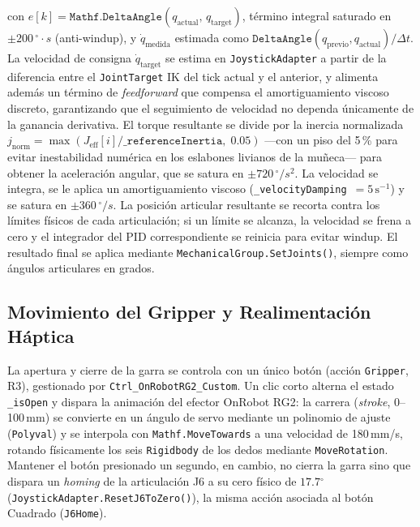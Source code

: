 con $e[k] = \texttt{Mathf.DeltaAngle}(q_{\text{actual}},\, q_{\text{target}})$, término integral saturado en $\pm 200\,{^\circ}{\cdot}s$ (anti-windup), y $\dot{q}_{\text{medida}}$ estimada como $\texttt{DeltaAngle}(q_{\text{previo}}, q_{\text{actual}})/\Delta t$. La velocidad de consigna $\dot{q}_{\text{target}}$ se estima en \texttt{JoystickAdapter} a partir de la diferencia entre el \texttt{JointTarget} IK del tick actual y el anterior, y alimenta además un término de \textit{feedforward} que compensa el amortiguamiento viscoso discreto, garantizando que el seguimiento de velocidad no dependa únicamente de la ganancia derivativa. El torque resultante se divide por la inercia normalizada $j_{\text{norm}} = \max(J_{\text{eff}}[i] / \texttt{\_referenceInertia},\; 0.05)$ ---con un piso del 5\,\% para evitar inestabilidad numérica en los eslabones livianos de la muñeca--- para obtener la aceleración angular, que se satura en $\pm 720\,{^\circ}/s^2$. La velocidad se integra, se le aplica un amortiguamiento viscoso (\texttt{\_velocityDamping}~$= 5\,\mathrm{s^{-1}}$) y se satura en $\pm 360\,{^\circ}/s$. La posición articular resultante se recorta contra los límites físicos de cada articulación; si un límite se alcanza, la velocidad se frena a cero y el integrador del PID correspondiente se reinicia para evitar windup. El resultado final se aplica mediante \texttt{MechanicalGroup.SetJoints()}, siempre como ángulos articulares en grados.

\subsection{Movimiento del Gripper y Realimentación Háptica}

La apertura y cierre de la garra se controla con un único botón (acción \texttt{Gripper}, R3), gestionado por \texttt{Ctrl\_OnRobotRG2\_Custom}. Un clic corto alterna el estado \texttt{\_isOpen} y dispara la animación del efector OnRobot RG2: la carrera (\textit{stroke}, 0--100\,mm) se convierte en un ángulo de servo mediante un polinomio de ajuste (\texttt{Polyval}) y se interpola con \texttt{Mathf.MoveTowards} a una velocidad de 180\,mm/s, rotando físicamente los seis \texttt{Rigidbody} de los dedos mediante \texttt{MoveRotation}. Mantener el botón presionado un segundo, en cambio, no cierra la garra sino que dispara un \textit{homing} de la articulación J6 a su cero físico de $17.7{^\circ}$ (\texttt{JoystickAdapter.ResetJ6ToZero()}), la misma acción asociada al botón Cuadrado (\texttt{J6Home}).

